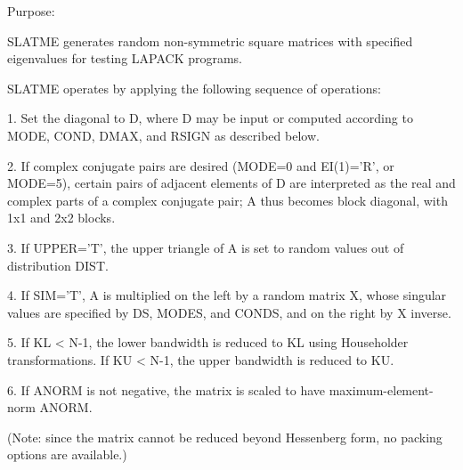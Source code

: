 \begin{DoxyParagraph}{Purpose\+: }
\begin{DoxyVerb}    SLATME generates random non-symmetric square matrices with
    specified eigenvalues for testing LAPACK programs.

    SLATME operates by applying the following sequence of
    operations:

    1. Set the diagonal to D, where D may be input or
         computed according to MODE, COND, DMAX, and RSIGN
         as described below.

    2. If complex conjugate pairs are desired (MODE=0 and EI(1)='R',
         or MODE=5), certain pairs of adjacent elements of D are
         interpreted as the real and complex parts of a complex
         conjugate pair; A thus becomes block diagonal, with 1x1
         and 2x2 blocks.

    3. If UPPER='T', the upper triangle of A is set to random values
         out of distribution DIST.

    4. If SIM='T', A is multiplied on the left by a random matrix
         X, whose singular values are specified by DS, MODES, and
         CONDS, and on the right by X inverse.

    5. If KL < N-1, the lower bandwidth is reduced to KL using
         Householder transformations.  If KU < N-1, the upper
         bandwidth is reduced to KU.

    6. If ANORM is not negative, the matrix is scaled to have
         maximum-element-norm ANORM.

    (Note: since the matrix cannot be reduced beyond Hessenberg form,
     no packing options are available.)\end{DoxyVerb}
 
\end{DoxyParagraph}

